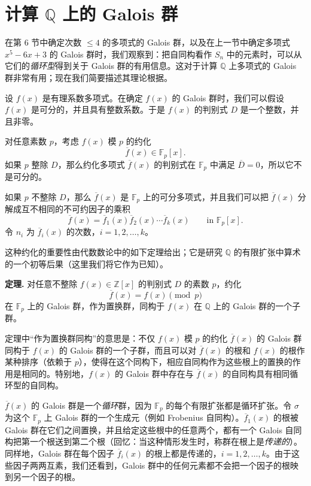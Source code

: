 \section{计算 $\mathbb Q$ 上的 Galois 群}

在第 6 节中确定次数 $\leq 4$ 的多项式的 Galois 群，以及在上一节中确定多项式 $x^5-6x+3$ 的 Galois 群时，我们观察到：把自同构看作 $S_n$ 中的元素时，可以从它们的\emph{循环型}得到关于 Galois 群的有用信息。这对于计算 $\mathbb Q$ 上多项式的 Galois 群非常有用；现在我们简要描述其理论根据。

设 $f(x)$ 是有理系数多项式。在确定 $f(x)$ 的 Galois 群时，我们可以假设 $f(x)$ 是可分的，并且具有整数系数。于是 $f(x)$ 的判别式 $D$ 是一个整数，并且非零。

对任意素数 $p$，考虑 $f(x)$ 模 $p$ 的约化
\[
\overline f(x)\in \mathbb F_p[x].
\]
如果 $p$ 整除 $D$，那么约化多项式 $\overline f(x)$ 的判别式在 $\mathbb F_p$ 中满足 $\overline D=0$，所以它不是可分的。

如果 $p$ 不整除 $D$，那么 $\overline f(x)$ 是 $\mathbb F_p$ 上的可分多项式，并且我们可以把 $\overline f(x)$ 分解成互不相同的不可约因子的乘积
\[
\overline f(x)=\overline f_1(x)\overline f_2(x)\cdots\overline f_k(x)
\qquad\text{in }\mathbb F_p[x].
\]
令 $n_i$ 为 $\overline f_i(x)$ 的次数，$i=1,2,\ldots,k$。

这种约化的重要性由代数数论中的如下定理给出；它是研究 $\mathbb Q$ 的有限扩张中算术的一个初等后果（这里我们将它作为已知）。

\noindent\textbf{定理.} 对任意不整除 $f(x)\in\mathbb Z[x]$ 的判别式 $D$ 的素数 $p$，约化
\[
\overline f(x)=f(x)\pmod p
\]
在 $\mathbb F_p$ 上的 Galois 群，作为置换群，同构于 $f(x)$ 在 $\mathbb Q$ 上的 Galois 群的一个子群。

定理中“作为置换群同构”的意思是：不仅 $f(x)$ 模 $p$ 的约化 $\overline f(x)$ 的 Galois 群同构于 $f(x)$ 的 Galois 群的一个子群，而且可以对 $\overline f(x)$ 的根和 $f(x)$ 的根作某种排序（依赖于 $p$），使得在这个同构下，相应自同构作为这些根上的置换的作用是相同的。特别地，$f(x)$ 的 Galois 群中存在与 $\overline f(x)$ 的自同构具有相同循环型的自同构。

$\overline f(x)$ 的 Galois 群是一个\emph{循环}群，因为 $\mathbb F_p$ 的每个有限扩张都是循环扩张。令 $\sigma$ 为这个 $\mathbb F_p$ 上 Galois 群的一个生成元（例如 Frobenius 自同构）。$\overline f_1(x)$ 的根被 Galois 群在它们之间置换，并且给定这些根中的任意两个，都有一个 Galois 自同构把第一个根送到第二个根（回忆：当这种情形发生时，称群在根上是\emph{传递的}）。同样地，Galois 群在每个因子 $\overline f_i(x)$ 的根上都是传递的，$i=1,2,\ldots,k$。由于这些因子两两互素，我们还看到，Galois 群中的任何元素都不会把一个因子的根映到另一个因子的根。

